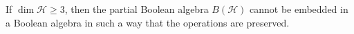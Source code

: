 If $\dim \mathcal{H} \geqslant 3$, then the partial Boolean algebra $B(\mathcal{H})$ cannot be embedded in a Boolean algebra in such a way that the operations are preserved.
